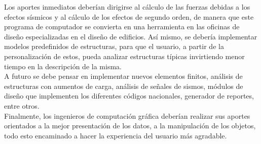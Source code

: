 Los aportes inmediatos deberían dirigirse al cálculo de las fuerzas debidas a los efectos sísmicos y al cálculo de los efectos de segundo orden, de manera que este programa de computador se convierta en una herramienta en las oficinas de diseño especializadas en el diseño de edificios. Así mismo, se debería implementar modelos predefinidos de estructuras, para que el usuario, a partir de la personalización de estos, pueda analizar estructuras típicas invirtiendo menor tiempo en la descripción de la misma. \\

A futuro se debe pensar en implementar nuevos elementos finitos, análisis de estructuras con aumentos de carga, análisis de señales de sismos, módulos de diseño que implementen los diferentes códigos nacionales, generador de reportes, entre otros. \\

Finalmente, los ingenieros de computación gráfica deberían realizar sus aportes orientados a la mejor presentación de los datos, a la manipulación de los objetos, todo esto encaminado a hacer la experiencia del usuario más agradable. \\